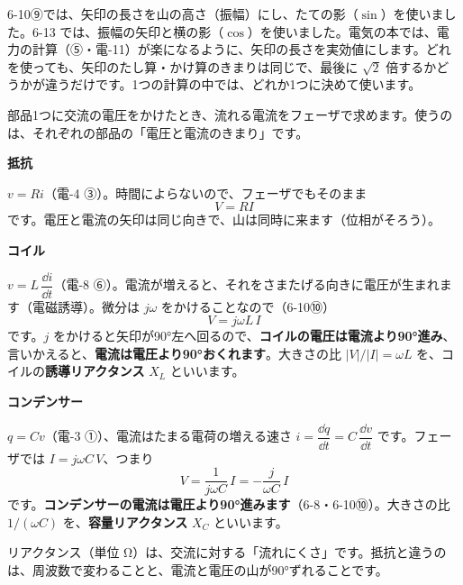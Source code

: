 \begin{seikaku}
6-10⑨では、矢印の長さを山の高さ（振幅）にし、たての影（$\sin$）を使いました。6-13 では、振幅の矢印と横の影（$\cos$）を使いました。電気の本では、電力の計算（⑤・電-11）が楽になるように、矢印の長さを実効値にします。どれを使っても、矢印のたし算・かけ算のきまりは同じで、最後に $\sqrt2$ 倍するかどうかが違うだけです。1つの計算の中では、どれか1つに決めて使います。
\end{seikaku}


\leavevmode\label{ph:電-10:sec4}部品1つに交流の電圧をかけたとき、流れる電流をフェーザで求めます。使うのは、それぞれの部品の「電圧と電流のきまり」です。

\noindent\textbf{抵抗}\par\nobreak
$v=Ri$（電-4 ③）。時間によらないので、フェーザでもそのまま
\[ V=RI \]
です。電圧と電流の矢印は同じ向きで、山は同時に来ます（位相がそろう）。

\noindent\textbf{コイル}\par\nobreak
$v=L\,\dfrac{\dd i}{\dd t}$（電-8 ⑥）。電流が増えると、それをさまたげる向きに電圧が生まれます（電磁誘導）。微分は $j\omega$ をかけることなので（6-10⑩）
\[ V=j\omega L\,I \]
です。$j$ をかけると矢印が90°左へ回るので、\textbf{コイルの電圧は電流より90°進み}、言いかえると、\textbf{電流は電圧より90°おくれます}。大きさの比 $\lvert V\rvert/\lvert I\rvert=\omega L$ を、コイルの\textbf{誘導リアクタンス} $X_L$ といいます。

\noindent\textbf{コンデンサー}\par\nobreak
$q=Cv$（電-3 ①）、電流はたまる電荷の増える速さ $i=\dfrac{\dd q}{\dd t}=C\,\dfrac{\dd v}{\dd t}$ です。フェーザでは $I=j\omega C\,V$、つまり
\[ V=\frac{1}{j\omega C}\,I=-\frac{j}{\omega C}\,I \]
です。\textbf{コンデンサーの電流は電圧より90°進みます}（6-8・6-10⑩）。大きさの比 $1/(\omega C)$ を、\textbf{容量リアクタンス} $X_C$ といいます。

\label{ph:電-10:A53}リアクタンス（単位 Ω）は、交流に対する「流れにくさ」です。抵抗と違うのは、周波数で変わることと、電流と電圧の山が90°ずれることです。

